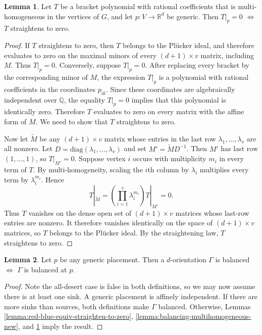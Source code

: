 \documentclass[11pt,letterpaper]{amsart}
\theoremstyle{definition}
\newtheorem{lemma}{Lemma}
\begin{document}
\begin{lemma}\label{lemma:generic-evaluation-straightening-new}
    Let $T$ be a bracket polynomial with rational coefficients that is multi-homogeneous in the vertices of $G$, and let $p:V\to\mathbb R^d$ be generic. Then $T|_p = 0$ $\iff$ $T$ straightens to zero.
\end{lemma}

\begin{proof}
    If $T$ straightens to zero, then $T$ belongs to the Pl\"ucker ideal, and therefore evaluates to zero on the maximal minors of every $(d+1) \times v$ matrix, including $M$. Thus $T|_p=0$.
    Conversely, suppose $T|_p=0$. After replacing every bracket by the corresponding minor of $M$, the expression $T|_p$ is a polynomial with rational coefficients in the coordinates $p_{ik}$. Since these coordinates are algebraically independent over $\mathbb Q$, the equality $T|_p=0$ implies that this polynomial is identically zero. Therefore $T$ evaluates to zero on every matrix with the affine form of $M$. We need to show that $T$ straightens to zero.

    Now let $\widetilde M$ be any $(d+1) \times v$ matrix whose entries in the last row $\lambda_1, \dots, \lambda_v$ are all nonzero. Let $D = \text{diag}(\lambda_1, \dots, \lambda_v)$ and set $M'=\widetilde{M} D^{-1}$. Then $M'$ has last row $(1,\dots,1)$, so $T|_{M'}=0$. Suppose vertex $i$ occurs with multiplicity $m_i$ in every term of $T$.  By multi-homogeneity, scaling the $i$th column by $\lambda_i$ multiplies every term by $\lambda_i^{m_i}$.  Hence
    \begin{equation*}
        T|_{\widetilde{M}} = \left(\prod_{i=1}^v \lambda_i^{m_i} \right) T|_{M'} = 0.
    \end{equation*}
    Thus $T$ vanishes on the dense open set of $(d+1)\times v$ matrices whose last-row entries are nonzero. It therefore vanishes identically on the space of $(d+1)\times v$ matrices, so $T$ belongs to the Pl\"ucker ideal.  By the straightening law, $T$ straightens to zero.
\end{proof}

\begin{lemma}\label{lemma:generic-geometric-balancing}
    Let $p$ be any generic placement.  Then a $d$-orientation
    $\Gamma$ is balanced $\iff$ $\Gamma$ is
    balanced at $p$.
\end{lemma}

\begin{proof}
    Note the all-desert case is false in both definitions, so we may now assume there is at least one sink. A generic placement is affinely independent.  If there are more sinks than sources, both definitions make $\Gamma$ balanced. Otherwise, Lemmas \ref{lemma:red-blue-equiv-straighten-to-zero}, \ref{lemma:balancing-multihomogeneous-new}, and \ref{lemma:generic-evaluation-straightening-new} imply the result.
\end{proof}
\end{document}
